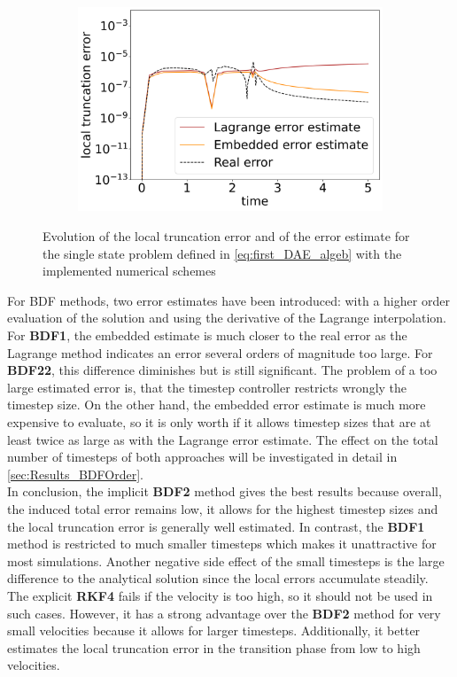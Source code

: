 \begin{figure}[H]
\begin{subfigure}{0.32\textwidth}
    	\includegraphics[width=1\textwidth]{images/errorEstimateBDF23.png}
        \label{fig:errorEstimateEvolutionBDF23}
    \end{subfigure}
    \caption{Evolution of the local truncation error and of the error estimate for the single state problem defined in \autoref{eq:first_DAE_algeb} with the implemented numerical schemes}
    \label{fig:errorEstimateEvolutionALL}
\end{figure}
\newpage
For BDF methods, two error estimates have been introduced: with a higher order evaluation of the solution and using the derivative of the Lagrange interpolation. For \textbf{BDF1}, the embedded estimate is much closer to the real error as the Lagrange method indicates an error several orders of magnitude too large. For \textbf{BDF22}, this difference diminishes but is still significant. The problem of a too large estimated error is, that the timestep controller restricts wrongly the timestep size. On the other hand, the embedded error estimate is much more expensive to evaluate, so it is only worth if it allows timestep sizes that are at least twice as large as with the Lagrange error estimate. The effect on the total number of timesteps of both approaches will be investigated in detail in \autoref{sec:Results_BDFOrder}. \\

In conclusion, the implicit \textbf{BDF2} method gives the best results because overall, the induced total error remains low, it allows for the highest timestep sizes and the local truncation error is generally well estimated. In contrast, the \textbf{BDF1} method is restricted to much smaller timesteps which makes it unattractive for most simulations. Another negative side effect of the small timesteps is the large difference to the analytical solution since the local errors accumulate steadily. The explicit \textbf{RKF4} fails if the velocity is too high, so it should not be used in such cases. However, it has a strong advantage over the \textbf{BDF2} method for very small velocities because it allows for larger timesteps. Additionally, it better estimates the local truncation error in the transition phase from low to high velocities.
